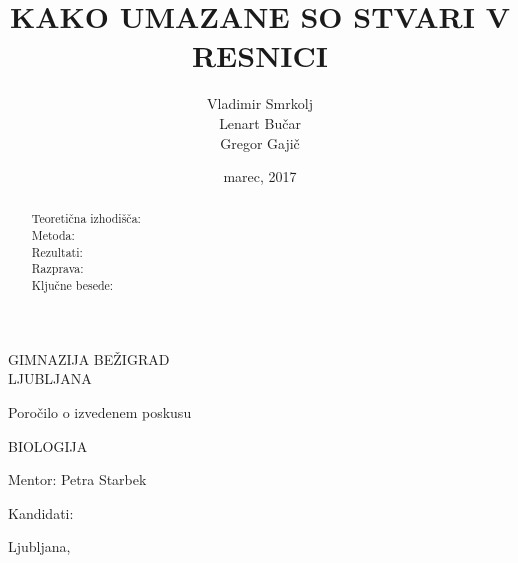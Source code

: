 \documentclass[12pt, a4paper]{report}
\begin{document}
\title{KAKO UMAZANE SO STVARI V RESNICI}
\author{Vladimir Smrkolj\\Lenart Bučar\\Gregor Gajič}
\date{marec, 2017}

\sffamily

\begin{titlepage}
\centering


{\Large{GIMNAZIJA BEŽIGRAD\\[2mm]LJUBLJANA}}

\vspace{3.5cm}

{\large Poročilo o izvedenem poskusu

\vspace{1cm}

BIOLOGIJA
}

\vspace{3.5cm}

\makeatletter
{\LARGE{\textbf{\@title}}}
\makeatother


\vfill


\parbox{4cm}{Mentor: Petra Starbek}
\hfill
\makeatletter
Kandidati: \parbox[t]{3cm}{\@author}
\makeatother

\vspace{3cm}

\makeatletter
Ljubljana, \@date
\makeatother

\end{titlepage}

\rhead{\parbox{2cm}{\today}\thepage}

\begin{abstract}
\begin{description}

\item[Teoretična izhodišča:]

\item[Metoda:]

\item[Rezultati:]

\item[Razprava:]

\item[Ključne besede:]

\end{description}
\end{abstract}

\tableofcontents
\end{document}
